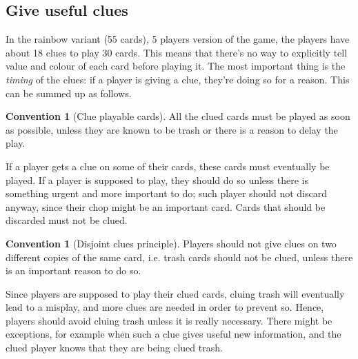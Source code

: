 \documentclass[a4paper]{article}
\theoremstyle{plain}
\theoremstyle{definition}
\newtheorem{convention}[theorem]{Convention}
\begin{document}
\subsection{Give useful clues}

In the rainbow variant (55 cards), 5 players version of the game, the players have about 18 clues to play 30 cards. This means that there's no way to explicitly tell value and colour of each card before playing it. The most important thing is the \textit{timing} of the clues: if a player is giving a clue, they're doing so for a reason. This can be summed up as follows.

\begin{convention}[Clue playable cards]
	\label{clue-playable-cards}
	All the clued cards must be played as soon as possible, unless they are known to be trash or there is a reason to delay the play.
\end{convention}

If a player gets a clue on some of their cards, these cards must eventually be played. If a player is supposed to play, they should do so unless there is something urgent and more important to do; such player should not discard anyway, since their chop might be an important card. Cards that should be discarded must not be clued.

\begin{convention}[Disjoint clues principle]
	\label{disjoint-clues}
	Players should not give clues on two different copies of the same card, i.e. trash cards should not be clued, unless there is an important reason to do so.
\end{convention}

Since players are supposed to play their clued cards, cluing trash will eventually lead to a misplay, and more clues are needed in order to prevent so. Hence, players should avoid cluing trash unless it is really necessary. There might be exceptions, for example when such a clue gives useful new information, and the clued player knows that they are being clued trash.
\end{document}
